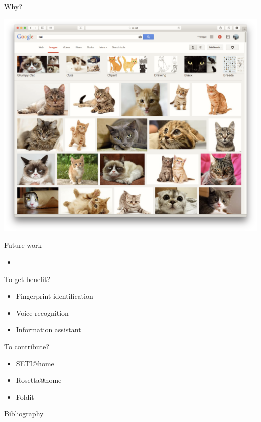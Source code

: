 \documentclass[first=dgreen,second=purple,logo=yellowexc]{aaltoslides}
\begin{document}
{\begin{frame}{Why?}
\begin{itemize}
\begin{center}
			\text{     }
			\includegraphics[scale=0.2]{./figures/googlecat.png}
		\end{center}
	\end{itemize}
\end{frame}

\begin{frame}{Future work}
	\begin{itemize}
		\item 
	\end{itemize}
\end{frame}


\begin{frame}{To get benefit?}
	\begin{itemize}
		\item Fingerprint identification
		\item Voice recognition
		\item Information assistant
	\end{itemize}
\end{frame}


\begin{frame}{To contribute?}
	\begin{itemize}
		\item SETI@home
		\item Rosetta@home
		\item Foldit
	\end{itemize}
\end{frame}










\begin{frame}[allowframebreaks]{Bibliography}
%

 
\end{frame}

}
\end{document}
